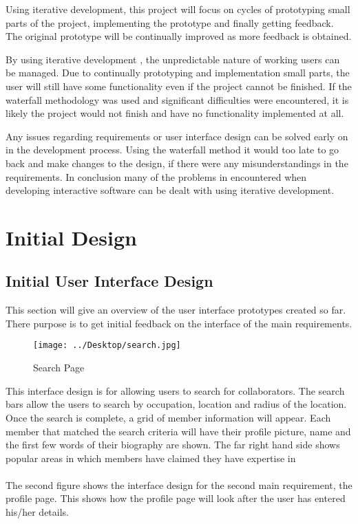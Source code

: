 \documentclass[a4paper,oneside,11pt]{report}
\begin{document}
Using iterative development, this project will focus on cycles of prototyping small parts of the project, implementing the prototype and finally getting feedback. The original prototype will be continually improved as more feedback is obtained.

By using iterative development , the unpredictable nature of working users can be managed. Due to continually prototyping and implementation small parts, the user will still have some functionality even if the project cannot be finished. If the waterfall methodology was used and significant difficulties were encountered, it is likely the project would not finish and have no functionality implemented at all. 

Any issues regarding requirements or user interface design can be solved early on in the development process. Using the waterfall method it would too late to go back and make changes to the design, if there were any misunderstandings in the requirements.
In conclusion many of the problems in encountered when developing interactive software can be dealt with using iterative development. 

\chapter{Initial Design}
\section{Initial User Interface Design}
This section will give an overview of the user interface prototypes created so far. There purpose is to get initial feedback on the interface of the main requirements.

\begin{figure}[!ht]
\centering
\texttt{[image: ../Desktop/search.jpg]}
\caption{Search Page}
\end{figure}
This interface design is for allowing users to search for collaborators. The search bars allow the users to search by occupation, location and radius of the location.
Once the search is complete, a grid of member information will appear. Each member that matched the search criteria will have their profile picture, name and the first few words of their biography are shown. The far right hand side shows popular areas in which members have claimed they have expertise in
\\
\\
The second figure shows the interface design for the second main requirement, the profile page. This shows how the profile page will look after the user has entered his/her details.
\end{document}
